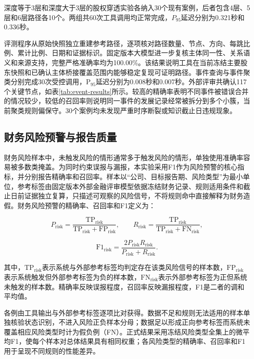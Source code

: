 深度等于3层和深度大于3层的股权穿透实验各纳入30个现有案例，后者包含4层、5层和6层路径各10个。两组共60次工具调用均正常完成，$P_{95}$延迟分别为0.321秒和0.336秒。

评测程序从原始快照独立重建参考路径，逐项核对路径数量、节点、方向、每跳比例、累计比例、日期和证据标识。固定版本大模型进一步复核主体同一性、关系语义和来源支持，完整严格准确率均为100.00\%。该结果说明工具在当前冻结主要股东快照和已确认主体桥接覆盖范围内能够稳定复现可证明路径。事件查询与事件聚类分别完成30次受控调用，$\mathrm{P}_{95}$延迟分别为0.008秒和0.007秒。外部评审共确认117个关键节点，如表\ref{tab:event-results}所示。较高的精确率表明不同事件被错误合并的情况较少，较低的召回率则说明同一事件的发展记录经常被拆分到多个小簇，当前聚类规则偏保守。30个案例均未发现严重时序断裂或知识截止日违规现象。

\subsection{财务风险预警与报告质量}

财务风险样本中，未触发风险的情形通常多于触发风险的情形，单独使用准确率容易被多数类掩盖。为同时约束误报与漏报，本实验采用F1作为风险预警的核心指标，并分别报告精确率和召回率。样本以“公司、目标报告期、风险类型”为最小单位，参考标签由固定版本外部金融评审模型依据冻结财务记录、规则适用条件和截止日前证据独立复算，只描述可观察的风险信号，不将规则命中直接解释为财务造假。财务风险预警的精确率、召回率和F1定义为：

\[
P_{\mathrm{risk}}=\frac{\mathrm{TP}_{\mathrm{risk}}}{\mathrm{TP}_{\mathrm{risk}}+\mathrm{FP}_{\mathrm{risk}}},
\qquad
R_{\mathrm{risk}}=\frac{\mathrm{TP}_{\mathrm{risk}}}{\mathrm{TP}_{\mathrm{risk}}+\mathrm{FN}_{\mathrm{risk}}},
\]

\[
\mathrm{F1}_{\mathrm{risk}}=\frac{2P_{\mathrm{risk}}R_{\mathrm{risk}}}{P_{\mathrm{risk}}+R_{\mathrm{risk}}}.
\]

其中，$\mathrm{TP}_{\mathrm{risk}}$表示系统与外部参考标签均判定存在该类风险信号的样本数，$\mathrm{FP}_{\mathrm{risk}}$表示系统触发但外部参考标签为负的样本数，$\mathrm{FN}_{\mathrm{risk}}$表示外部参考标签为正但系统未触发的样本数。精确率反映误报程度，召回率反映漏报程度，F1是二者的调和平均值。

各例由工具输出与外部参考标签逐项比对获得。数据不足和规则无法适用的样本单独核验状态识别，不进入风险正负样本分母；数据足以形成正向参考标签而系统未覆盖相应风险类型时计为假负例（FN）。正式结果采用冻结风险类型全集上的微平均F1，使每个样本对总体结果具有相同权重；各风险类型的精确率、召回率和F1用于呈现不同规则的性能差异。

